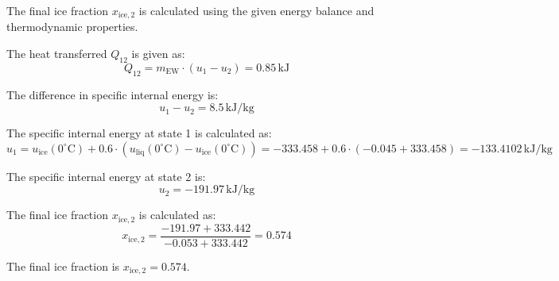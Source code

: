 The final ice fraction \( x_{\text{ice},2} \) is calculated using the given energy balance and thermodynamic properties.  

The heat transferred \( Q_{12} \) is given as:  
\[
Q_{12} = m_{\text{EW}} \cdot (u_1 - u_2) = 0.85 \, \text{kJ}
\]  

The difference in specific internal energy is:  
\[
u_1 - u_2 = 8.5 \, \text{kJ/kg}
\]  

The specific internal energy at state 1 is calculated as:  
\[
u_1 = u_{\text{ice}}(0^\circ\text{C}) + 0.6 \cdot (u_{\text{liq}}(0^\circ\text{C}) - u_{\text{ice}}(0^\circ\text{C})) = -333.458 + 0.6 \cdot (-0.045 + 333.458) = -133.4102 \, \text{kJ/kg}
\]  

The specific internal energy at state 2 is:  
\[
u_2 = -191.97 \, \text{kJ/kg}
\]  

The final ice fraction \( x_{\text{ice},2} \) is calculated as:  
\[
x_{\text{ice},2} = \frac{-191.97 + 333.442}{-0.053 + 333.442} = 0.574
\]  

The final ice fraction is \( x_{\text{ice},2} = 0.574 \).